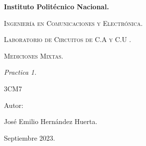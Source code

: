 \documentclass[10pt]{article}
\begin{document}
\pagestyle{fancy}
\cfoot{}



\begin{titlepage}

	\begin{figure}[t]
		\hspace{0.6\textwidth}
	\end{figure}

	\centering
	{\bfseries\Huge Instituto Politécnico Nacional. \par}
	\vspace{1cm}
	{\scshape\Large Ingeniería en Comunicaciones y Electrónica. \par}
	\vspace{0.3cm}
	{\scshape\Large Laboratorio de Circuitos de C.A y C.U .  \par}
	\vspace{1cm}
	{\scshape\Huge Mediciones Mixtas. \par}
	{\itshape\Large Practica 1. \par}
	\vspace{1cm}
	{\Large 3CM7\par}
	\vfill
	{\Large Autor: \par}

	{\Large José Emilio Hernández Huerta. \par}

	\vfill
	{\Large Septiembre 2023. \par}

\end{titlepage}

\tableofcontents
\newpage
\end{document}
